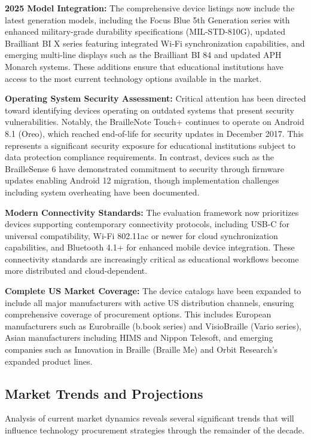 \textbf{2025 Model Integration:} The comprehensive device listings now include the latest generation models, including the Focus Blue 5th Generation series with enhanced military-grade durability specifications (MIL-STD-810G), updated Brailliant BI X series featuring integrated Wi-Fi synchronization capabilities, and emerging multi-line displays such as the Brailliant BI 84 and updated APH Monarch systems. These additions ensure that educational institutions have access to the most current technology options available in the market.

\textbf{Operating System Security Assessment:} Critical attention has been directed toward identifying devices operating on outdated systems that present security vulnerabilities. Notably, the BrailleNote Touch+ continues to operate on Android 8.1 (Oreo), which reached end-of-life for security updates in December 2017. This represents a significant security exposure for educational institutions subject to data protection compliance requirements. In contrast, devices such as the BrailleSense 6 have demonstrated commitment to security through firmware updates enabling Android 12 migration, though implementation challenges including system overheating have been documented.

\textbf{Modern Connectivity Standards:} The evaluation framework now prioritizes devices supporting contemporary connectivity protocols, including USB-C for universal compatibility, Wi-Fi 802.11ac or newer for cloud synchronization capabilities, and Bluetooth 4.1+ for enhanced mobile device integration. These connectivity standards are increasingly critical as educational workflows become more distributed and cloud-dependent.

\textbf{Complete US Market Coverage:} The device catalogs have been expanded to include all major manufacturers with active US distribution channels, ensuring comprehensive coverage of procurement options. This includes European manufacturers such as Eurobraille (b.book series) and VisioBraille (Vario series), Asian manufacturers including HIMS and Nippon Telesoft, and emerging companies such as Innovation in Braille (Braille Me) and Orbit Research's expanded product lines.

\subsection{Market Trends and Projections}\label{ch3:ssec:market-trends}
Analysis of current market dynamics reveals several significant trends that will influence technology procurement strategies through the remainder of the decade.

